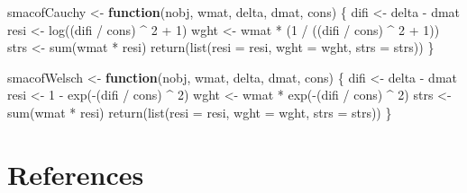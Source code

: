 \documentclass[
  12pt,
  letterpaper,
  DIV=11,
  numbers=noendperiod]{scrartcl}
\newenvironment{Shaded}{\begin{snugshade}}{\end{snugshade}}
\newcommand{\AttributeTok}[1]{\textcolor[rgb]{0.40,0.45,0.13}{#1}}
\newcommand{\ControlFlowTok}[1]{\textcolor[rgb]{0.00,0.23,0.31}{\textbf{#1}}}
\newcommand{\DecValTok}[1]{\textcolor[rgb]{0.68,0.00,0.00}{#1}}
\newcommand{\FunctionTok}[1]{\textcolor[rgb]{0.28,0.35,0.67}{#1}}
\newcommand{\NormalTok}[1]{\textcolor[rgb]{0.00,0.23,0.31}{#1}}
\newcommand{\OtherTok}[1]{\textcolor[rgb]{0.00,0.23,0.31}{#1}}
\newcommand{\SpecialCharTok}[1]{\textcolor[rgb]{0.37,0.37,0.37}{#1}}
\begin{document}
\begin{Shaded}
\begin{Highlighting}[]
\NormalTok{smacofCauchy }\OtherTok{\textless{}{-}} \ControlFlowTok{function}\NormalTok{(nobj, wmat, delta, dmat, cons) \{}
\NormalTok{  difi }\OtherTok{\textless{}{-}}\NormalTok{ delta }\SpecialCharTok{{-}}\NormalTok{ dmat}
\NormalTok{  resi }\OtherTok{\textless{}{-}} \FunctionTok{log}\NormalTok{((difi }\SpecialCharTok{/}\NormalTok{ cons) }\SpecialCharTok{\^{}} \DecValTok{2} \SpecialCharTok{+} \DecValTok{1}\NormalTok{)}
\NormalTok{  wght }\OtherTok{\textless{}{-}}\NormalTok{ wmat }\SpecialCharTok{*}\NormalTok{ (}\DecValTok{1} \SpecialCharTok{/}\NormalTok{ ((difi }\SpecialCharTok{/}\NormalTok{ cons) }\SpecialCharTok{\^{}} \DecValTok{2} \SpecialCharTok{+} \DecValTok{1}\NormalTok{))}
\NormalTok{  strs }\OtherTok{\textless{}{-}} \FunctionTok{sum}\NormalTok{(wmat }\SpecialCharTok{*}\NormalTok{ resi)}
  \FunctionTok{return}\NormalTok{(}\FunctionTok{list}\NormalTok{(}\AttributeTok{resi =}\NormalTok{ resi, }\AttributeTok{wght =}\NormalTok{ wght, }\AttributeTok{strs =}\NormalTok{ strs))}
\NormalTok{\}}

\NormalTok{smacofWelsch }\OtherTok{\textless{}{-}} \ControlFlowTok{function}\NormalTok{(nobj, wmat, delta, dmat, cons) \{}
\NormalTok{  difi }\OtherTok{\textless{}{-}}\NormalTok{ delta }\SpecialCharTok{{-}}\NormalTok{ dmat}
\NormalTok{  resi }\OtherTok{\textless{}{-}} \DecValTok{1} \SpecialCharTok{{-}} \FunctionTok{exp}\NormalTok{(}\SpecialCharTok{{-}}\NormalTok{(difi }\SpecialCharTok{/}\NormalTok{ cons) }\SpecialCharTok{\^{}} \DecValTok{2}\NormalTok{)}
\NormalTok{  wght }\OtherTok{\textless{}{-}}\NormalTok{ wmat }\SpecialCharTok{*} \FunctionTok{exp}\NormalTok{(}\SpecialCharTok{{-}}\NormalTok{(difi }\SpecialCharTok{/}\NormalTok{ cons) }\SpecialCharTok{\^{}} \DecValTok{2}\NormalTok{)}
\NormalTok{  strs }\OtherTok{\textless{}{-}} \FunctionTok{sum}\NormalTok{(wmat }\SpecialCharTok{*}\NormalTok{ resi)}
  \FunctionTok{return}\NormalTok{(}\FunctionTok{list}\NormalTok{(}\AttributeTok{resi =}\NormalTok{ resi, }\AttributeTok{wght =}\NormalTok{ wght, }\AttributeTok{strs =}\NormalTok{ strs))}
\NormalTok{\}}
\end{Highlighting}
\end{Shaded}

\section*{References}\label{references}
\end{document}
